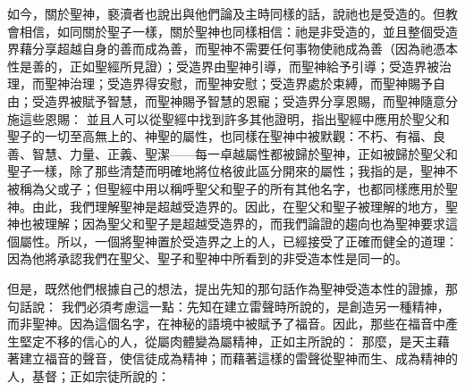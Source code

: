 如今，關於聖神，褻瀆者也說出與他們論及主時同樣的話，說祂也是受造的。但教會相信，如同關於聖子一樣，關於聖神也同樣相信：祂是非受造的，並且整個受造界藉分享超越自身的善而成為善，而聖神不需要任何事物使祂成為善（因為祂憑本性是善的，正如聖經所見證）；受造界由聖神引導，而聖神給予引導；受造界被治理，而聖神治理；受造界得安慰，而聖神安慰；受造界處於束縛，而聖神賜予自由；受造界被賦予智慧，而聖神賜予智慧的恩寵；受造界分享恩賜，而聖神隨意分施這些恩賜： 並且人可以從聖經中找到許多其他證明，指出聖經中應用於聖父和聖子的一切至高無上的、神聖的屬性，也同樣在聖神中被默觀：不朽、有福、良善、智慧、力量、正義、聖潔——每一卓越屬性都被歸於聖神，正如被歸於聖父和聖子一樣，除了那些清楚而明確地將位格彼此區分開來的屬性；我指的是，聖神不被稱為父或子；但聖經中用以稱呼聖父和聖子的所有其他名字，也都同樣應用於聖神。由此，我們理解聖神是超越受造界的。因此，在聖父和聖子被理解的地方，聖神也被理解；因為聖父和聖子是超越受造界的，而我們論證的趨向也為聖神要求這個屬性。所以，一個將聖神置於受造界之上的人，已經接受了正確而健全的道理：因為他將承認我們在聖父、聖子和聖神中所看到的非受造本性是同一的。\par

但是，既然他們根據自己的想法，提出先知的那句話作為聖神受造本性的證據，那句話說： 我們必須考慮這一點：先知在建立雷聲時所說的，是創造另一種精神，而非聖神。因為這個名字，在神秘的語境中被賦予了福音。因此，那些在福音中產生堅定不移的信心的人，從屬肉體變為屬精神，正如主所說的： 那麼，是天主藉著建立福音的聲音，使信徒成為精神；而藉著這樣的雷聲從聖神而生、成為精神的人，基督；正如宗徒所說的：\par

